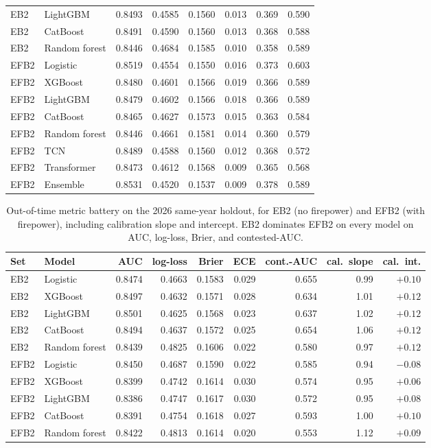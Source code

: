 \documentclass[11pt,a4paper]{article}
\begin{document}
\begin{table}[t]
\begin{tabular}{llrrrrrr}
EB2 & LightGBM & 0.8493 & 0.4585 & 0.1560 & 0.013 & 0.369 & 0.590 \\
EB2 & CatBoost & 0.8491 & 0.4590 & 0.1560 & 0.013 & 0.368 & 0.588 \\
EB2 & Random forest & 0.8446 & 0.4684 & 0.1585 & 0.010 & 0.358 & 0.589 \\
\midrule
EFB2 & Logistic & 0.8519 & 0.4554 & 0.1550 & 0.016 & 0.373 & 0.603 \\
EFB2 & XGBoost & 0.8480 & 0.4601 & 0.1566 & 0.019 & 0.366 & 0.589 \\
EFB2 & LightGBM & 0.8479 & 0.4602 & 0.1566 & 0.018 & 0.366 & 0.589 \\
EFB2 & CatBoost & 0.8465 & 0.4627 & 0.1573 & 0.015 & 0.363 & 0.584 \\
EFB2 & Random forest & 0.8446 & 0.4661 & 0.1581 & 0.014 & 0.360 & 0.579 \\
\midrule
EFB2 & TCN & 0.8489 & 0.4588 & 0.1560 & 0.012 & 0.368 & 0.572 \\
EFB2 & Transformer & 0.8473 & 0.4612 & 0.1568 & 0.009 & 0.365 & 0.568 \\
EFB2 & Ensemble & 0.8531 & 0.4520 & 0.1537 & 0.009 & 0.378 & 0.589 \\
\bottomrule
\end{tabular}
\end{table}

\begin{table}[t]
\centering
\caption{Out-of-time metric battery on the 2026 same-year holdout, for EB2 (no firepower) and EFB2
(with firepower), including calibration slope and intercept. EB2 dominates EFB2 on every model on AUC,
log-loss, Brier, and contested-AUC.}
\label{tab:appB2}
\small
\begin{tabular}{llrrrrrrr}
\toprule
Set & Model & AUC & log-loss & Brier & ECE & cont.-AUC & cal.\ slope & cal.\ int. \\
\midrule
EB2 & Logistic & 0.8474 & 0.4663 & 0.1583 & 0.029 & 0.655 & 0.99 & $+0.10$ \\
EB2 & XGBoost & 0.8497 & 0.4632 & 0.1571 & 0.028 & 0.634 & 1.01 & $+0.12$ \\
EB2 & LightGBM & 0.8501 & 0.4625 & 0.1568 & 0.023 & 0.637 & 1.02 & $+0.12$ \\
EB2 & CatBoost & 0.8494 & 0.4637 & 0.1572 & 0.025 & 0.654 & 1.06 & $+0.12$ \\
EB2 & Random forest & 0.8439 & 0.4825 & 0.1606 & 0.022 & 0.580 & 0.97 & $+0.12$ \\
\midrule
EFB2 & Logistic & 0.8450 & 0.4687 & 0.1590 & 0.022 & 0.585 & 0.94 & $-0.08$ \\
EFB2 & XGBoost & 0.8399 & 0.4742 & 0.1614 & 0.030 & 0.574 & 0.95 & $+0.06$ \\
EFB2 & LightGBM & 0.8386 & 0.4747 & 0.1617 & 0.030 & 0.572 & 0.95 & $+0.08$ \\
EFB2 & CatBoost & 0.8391 & 0.4754 & 0.1618 & 0.027 & 0.593 & 1.00 & $+0.10$ \\
EFB2 & Random forest & 0.8422 & 0.4813 & 0.1614 & 0.020 & 0.553 & 1.12 & $+0.09$ \\
\bottomrule
\end{tabular}
\end{table}
\end{document}
